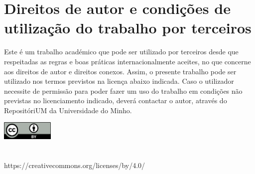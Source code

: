 
\chapter*{Direitos de autor e condi\c c\~oes de utiliza\c c\~ao do trabalho por terceiros}

Este \'e um trabalho acad\'emico que pode ser utilizado por terceiros desde que respeitadas as regras e boas pr\'aticas internacionalmente aceites, no que concerne aos direitos de autor e direitos conexos.
Assim, o presente trabalho pode ser utilizado nos termos previstos na licen\c ca abaixo indicada.
Caso o utilizador necessite de permiss\~ao para poder fazer um uso do trabalho em condi\c c\~oes n\~ao previstas no licenciamento indicado, dever\'a contactar o autor, atrav\'es do Reposit\'oriUM da Universidade do Minho.

\vspace{0.5cm}

\noindent {} 

\vspace{0.5cm}

\noindent \includegraphics[width=2.5cm]{preamble/creative_commons/by.png}\\
\noindent {}\\
\noindent {}\\
\noindent https://creativecommons.org/licenses/by/4.0/


